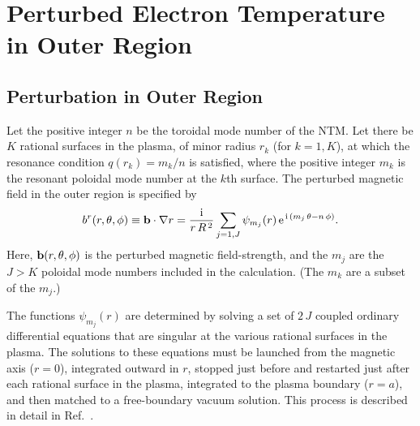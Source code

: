 \documentclass[12pt,prb,aps]{revtex4-1}
\begin{document}
\section{Perturbed Electron Temperature  in Outer Region}\label{s3}
\subsection{Perturbation in Outer Region}
Let the positive integer $n$ be the toroidal mode number of the NTM. Let there be $K$ rational surfaces in the plasma, of minor radius $r_k$ (for $k=1,K$),  at which the resonance condition
$q(r_k) = m_k/n$ is satisfied, where the positive integer $m_k$ is the resonant poloidal mode number at the $k$th surface. The perturbed magnetic field in the outer region is specified by\,\cite{tear9,tear10}
\begin{equation}
b^r(r,\theta,\phi)\equiv {\bf b}\cdot\nabla r = \frac{{\rm i}}{r\,R^{\,2}}\sum_{j=1,J} \psi_{m_j}(r)\,{\rm e}^{\,{\rm i}\,(m_j\,\theta-n\,\phi)}.
\end{equation}
Here, ${\bf b}(r,\theta,\phi)$ is the perturbed magnetic field-strength, and the $m_j$ are the  $J>K$ poloidal mode numbers included in the calculation. (The $m_k$ are a subset of the $m_j$.) 

The functions $\psi_{m_j}(r)$ are determined by solving a set of $2\,J$ coupled ordinary differential equations that are singular at the
various rational surfaces in the plasma. The solutions to these equations must be launched from the magnetic axis ($r=0$), integrated outward in $r$, stopped   just before and  restarted just after each rational surface in the plasma, integrated to the plasma boundary ($r=a$), and then matched to a free-boundary vacuum
solution. This process is described in detail in Ref.~. 
\end{document}
